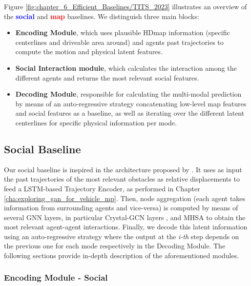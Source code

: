 Figure \ref{fig:chapter_6_Efficient_Baselines/TITS_2023} illustrates an overview of the \textbf{\textcolor{blue}{social}} and \textbf{\textcolor{red}{map}} baselines. We distinguish three main blocks: 

\begin{itemize}
	
	\item \textbf{Encoding Module}, which uses plausible \ac{HDmap} information (specific centerlines and driveable area around) and agents past trajectories to compute the motion and physical latent features.
	
	\item \textbf{Social Interaction module}, which calculates the interaction among the different agents and returns the most relevant social features.
	
	\item \textbf{Decoding Module}, responsible for calculating the multi-modal prediction by means of an auto-regressive strategy concatenating low-level map features and social features as a baseline, as well as iterating over the different latent centerlines for specific physical information per mode.
\end{itemize}

\subsection{Social Baseline}
\label{subsec:6_efficient_baselines_social}

Our social baseline is inspired in the architecture proposed by \cite{schmidt2022crat}. It uses as input the past trajectories of the most relevant obstacles as relative displacements to feed a \ac{LSTM}-based Trajectory Encoder, as performed in Chapter \ref{cha:exploring_gan_for_vehicle_mp}. Then, node aggregation (each agent takes information from surrounding agents and vice-versa) is computed by means of several \ac{GNN} layers, in particular Crystal-\acf{GCN} layers \cite{xie2018crystal, schmidt2022crat}, and \ac{MHSA} \cite{vaswani2017attention} to obtain the most relevant agent-agent interactions. Finally, we decode this latent information using an auto-regressive strategy where the output at the \textit{i-th} step depends on the previous one for each mode respectively in the Decoding Module. The following sections provide in-depth description of the aforementioned modules.

\subsubsection{Encoding Module - Social}
\label{subsubsec:6_efficient_baselines_social_encoding}

